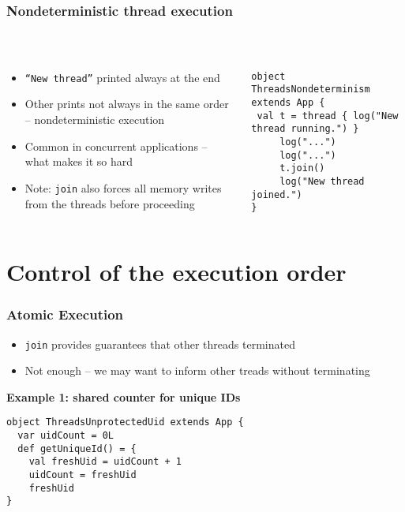 \documentclass[aspectratio=169]{beamer}
\begin{document}
\begin{frame}[fragile]\frametitle{Nondeterministic thread execution}
~\\[-8mm]
\begin{columns}
\begin{column}{0.49\textwidth}
\begin{itemize}
  \item \texttt{``New thread''} printed always at the end
  \item Other prints not always in the same order -- nondeterministic execution
  \item Common in concurrent applications -- what makes it so hard
  \item Note: \texttt{join} also forces all memory writes from the threads before proceeding
\end{itemize}

\end{column}
\begin{column}{0.49\textwidth}
\begin{lstlisting}[emph={sleep,log,thread,join}]
object ThreadsNondeterminism extends App {
 val t = thread { log("New thread running.") }
     log("...")
     log("...")
     t.join()
     log("New thread joined.")
}
\end{lstlisting}
\end{column}
\end{columns}
\end{frame}


\section{Control of the execution order}

\begin{frame}[fragile]\frametitle{Atomic Execution}
\begin{itemize}
  \item \texttt{join} provides guarantees that other threads terminated
  \item Not enough -- we may want to inform other treads without terminating
\end{itemize}

\textbf{Example 1: shared counter for unique IDs}
\begin{lstlisting}[emph={sleep,log,thread,join}]
object ThreadsUnprotectedUid extends App {
  var uidCount = 0L
  def getUniqueId() = {
    val freshUid = uidCount + 1
    uidCount = freshUid
    freshUid
}
\end{lstlisting}

\end{frame}
\end{document}
